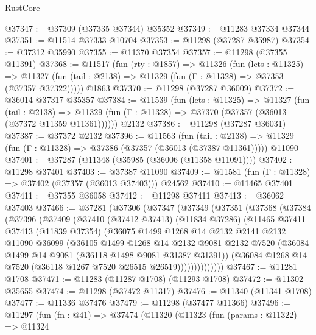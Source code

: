 \begin{lexlean}{RustCore}
\begin{coremodule}
@37347 := @37309 (@37335 @37344) @35352
@37349 := @11283 @37334 @37344
@37351 := @11514 @37333 @10704
@37353 := @11298 (@37287 @35987)
@37354 := @37312 @35990
@37355 := @11370 @37354
@37357 := @11298 (@37355 @11391)
@37368 := @11517
    (fun (rty : @1857) =>
    @11326
      (fun (lets : @11325) =>
      @11327 (fun (tail : @2138) => @11329 (fun (Γ : @11328) => @37353 (@37357 @37322)))))
    @1863
@37370 := @11298 (@37287 @36009)
@37372 := @36014 @37317 @35357
@37384 := @11539
    (fun (lets : @11325) =>
    @11327
      (fun (tail : @2138) =>
      @11329 (fun (Γ : @11328) => @37370 (@37357 (@36013 (@37372 @11359 @11361))))))
    @2132
@37386 := @11298 (@37287 @36031)
@37387 := @37372 @2132
@37396 := @11563
    (fun (tail : @2138) => @11329 (fun (Γ : @11328) => @37386 (@37357 (@36013 (@37387 @11361)))))
    @11090
@37401 := @37287 (@11348 (@35985 (@36006 (@11358 @11091))))
@37402 := @11298 @37401
@37403 := @37387 @11090
@37409 := @11581 (fun (Γ : @11328) => @37402 (@37357 (@36013 @37403))) @24562
@37410 := @11465 @37401
@37411 := @37355 @36058
@37412 := @11298 @37411
@37413 := @36062 @37403
@37466 := @37281
    (@37306
      (@37347
        (@37349
          (@37351
            (@37368
              (@37384
                (@37396
                  (@37409
                    (@37410
                      (@37412 @37413)
                      (@11834 @37286)
                      (@11465
                        @37411
                        @37413
                        (@11839 @37354)
                        (@36075
                          @1499
                          @1268
                          @14
                          @2132
                          @2141
                          @2132
                          @11090
                          @36099
                          (@36105
                            @1499
                            @1268
                            @14
                            @2132
                            @9081
                            @2132
                            @7520
                            (@36084 @1499 @14 @9081 (@36118 @1498 @9081 @31387 @31391))
                            (@36084 @1268 @14 @7520 (@36118 @1267 @7520 @26515 @26519))))))))))))))
@37467 := @11281 @1708
@37471 := @11283 (@11287 @1708) (@11293 @1708)
@37472 := @11302 @35655
@37474 := @11298 (@37472 @11317)
@37476 := @11340 (@11341 @1708)
@37477 := @11336 @37476
@37479 := @11298 (@37477 @11366)
@37496 := @11297
    (fun (fn : @41) =>
    @37474
      (@11320
        (@11323
          (fun (params : @11322) =>
          @11324

\end{coremodule}
\end{lexlean}

